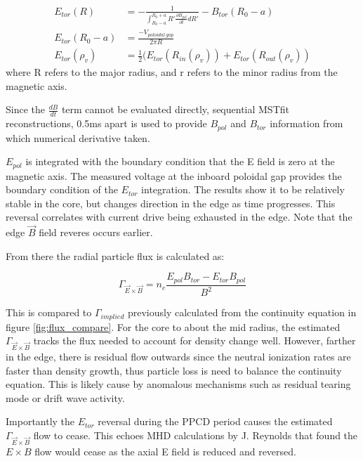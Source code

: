 \documentclass[aip, pop, preprint]{revtex4-1}
\begin{document}
\begin{align}
E_{tor}(R) & = -\frac{1}{\int_{R_0 - a}^{R_0 + a} R' \frac{\partial B_{pol}}{\partial t} dR'} - B_{tor}(R_0 - a) \label{eqn:E_tor}\\
E_{tor} (R_0 - a) & = \frac{- V_{poloidal\ gap} }{2 \pi R}\label{eqn:E_tor_bc}\\
E_{tor}(\rho_v) & = \frac{1}{2}(E_{tor}(R_{in}(\rho_v)) + E_{tor}(R_{out}(\rho_v))
\end{align}
where R refers to the major radius, and r refers to the minor radius from the magnetic axis.

Since the $ \frac{dB}{dt} $ term cannot be evaluated directly, sequential
MSTfit reconstructions, 0.5ms apart is used to provide $ B_{pol} $ and $
B_{tor} $ information from which numerical derivative taken.

$E_{pol}$ is integrated with the boundary condition that the E field is zero at
the magnetic axis. The measured voltage at the inboard poloidal gap provides
the boundary condition of the $ E_{tor} $ integration. The results show it to
be relatively stable in the core, but changes direction in the edge as time
progresses. This reversal correlates with current drive being exhausted in the
edge. Note that the edge $\vec{B}$ field reveres occurs earlier.

From there the radial particle flux is calculated as:

\begin{equation}
\Gamma_{\vec{E} \times \vec{B}} = n_{e} \frac{E_{pol}B_{tor} - E_{tor}B_{pol}}{B^2}
\end{equation}

This is compared to $\Gamma_{implied}$ previously calculated from the
continuity equation in figure \ref{fig:flux_compare}. For the core to about the
mid radius, the estimated $\Gamma_{\vec{E} \times \vec{B}}$ tracks the flux
needed to account for density change well. However, farther in the edge, there
is residual flow outwards since the neutral ionization rates are faster than
density growth, thus particle loss is need to balance the continuity equation.
This is likely cause by anomalous mechanisms such as residual tearing mode or
drift wave activity.

Importantly the $ E_{tor} $ reversal during the PPCD period causes the
estimated $ \Gamma_{\vec{E} \times \vec{B}} $ flow to cease. This echoes MHD
calculations by J. Reynolds that found the $ E \times B $ flow would cease as
the axial E field is reduced and reversed\cite{ReynoldsThesis}.
\end{document}
